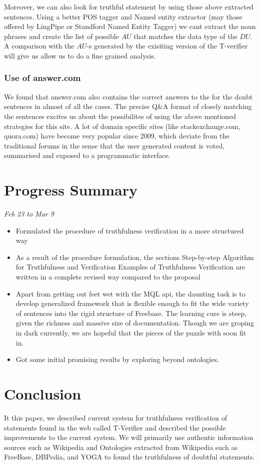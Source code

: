 \documentclass[11pt]{article}
\begin{document}
Moreover, we can also look for truthful statement by using those above extracted sentences. Using a better POS tagger and Named entity extractor (may those offered by LingPipe or Standford Named Entity Tagger) we cant extract the noun phrases and create the list of possible $AU$ that matches the data type of the $DU$. A comparison with the $AU$-s generated by the exisiting version of the T-verifier will give us allow us to do a fine grained analysis.

\subsubsection{Use of answer.com}
We found that answer.com also contains the correct answers to the for the doubt sentences in almost of all the cases. The precise Q\&A format of closely matching the sentences excites us about the possibilites of using the above mentioned strategies for this site. A lot of domain specific sites (like stackexchange.com, quora.com) have become very popular since 2009, which deviate from the traditional forums in the sense that the user generated content is voted, summarised and exposed to a programmatic interface. 

\section{Progress Summary}

{\em Feb 23 to Mar 9} 
\begin{itemize}
\item Formulated the procedure of truthfulness verification in a more structured way
\item As a result of the procedure formulation, the sections Step-by-step Algorithm for Truthfulness and Verification Examples of Truthfulness Verification are written in a complete revised way compared to the proposal
\item Apart from getting out feet wet with the MQL api, the daunting task is to develop generalized framework that is flexible enough to fit the wide variety of sentences into the rigid structure of Freebase. The learning cure is steep, given the richness and massive size of documentation. Though we are groping in dark currently, we are hopeful that the pieces of the puzzle with soon fit in.
\item Got some initial promising results by exploring beyond ontologies. 
\end{itemize}

\section{Conclusion}
It this paper, we described current system for truthfulness verification of statements found in the web called T-Verifier and described the possible improvements to the current system. We will primarily use authentic information sources such as Wikipedia and Ontologies extracted from Wikipedia such as FreeBase, DBPedia, and YOGA to found the truthfulness of doubtful statements.  




\end{document}
